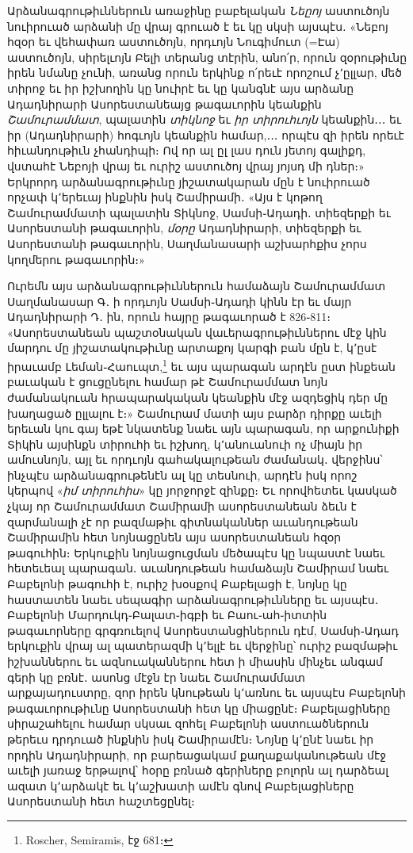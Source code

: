 \documentclass{article}
\begin{document}
{Արձանագրութիւններուն առաջինը բաբելական \emph{Նեըոյ} աստուծոյն նուիրուած արձանի մը վրայ գրուած է եւ կը սկսի այսպէս․ «Նեբոյ հզօր եւ վեհափառ աստուծոյն, որդւոյն Նուգիմուտ (=Էա) աստուծոյն, սիրելւոյն Բելի տերանց տէրին, անո՛ր, որուն զօրութիւնը իրեն նմանը չունի, առանց որուն երկինք ո՛րեւէ որոշում չ՚ըլլար, մեծ տիրոջ եւ իր իշխողին կը նուիրէ եւ կը կանգնէ այս արձանը Ադադնիրարի Ասորեստանեայց թագաւորին կեանքին \emph{Շամուրամմատ}, պալատին \emph{տիկնոջ} եւ \emph{իր տիրուհւոյն} կեանքին․․․ եւ իր (Ադադնիրարի) հոգւոյն կեանքին համար,․․․ որպէս զի իրեն որեւէ հիւանդութիւն չհանդիպի։ Ով որ ալ ըլ լաս դուն յետոյ գալիքդ, վստահէ Նեբոյի վրայ եւ ուրիշ աստուծոյ վրայ յոյսդ մի դներ։» Երկրորդ արձանագրութիւնը յիշատակարան մըն է նուիրուած որչափ կ՚երեւայ ինքնին իսկ Շամիրամի․ «Այս է կոթող Շամուրամմատի պալատին Տիկնոջ, Սամսի֊Ադադի․ տիեզերքի եւ Ասորեստանի թագաւորին, \emph{մօրը} Ադադնիրարի, տիեզերքի եւ Ասորեստանի թագաւորին, Սաղմանասարի աշխարհքիս չորս կողմերու թագաւորին։»

Ուրեմն այս արձանագրութիւններուն համաձայն Շամուրամմատ Սաղմանասար Գ․ ի որդւոյն Սամսի֊Ադադի կինն էր եւ մայր Ադադնիրարի Դ․ ին, որուն հայրը թագաւորած է 826֊811։ «Ասորեստանեան պաշտօնական վաւերագրութիւններու մէջ կին մարդու մը յիշատակութիւնը արտաքոյ կարգի բան մըն է, կ՚ըսէ իրաւամբ Լեման֊Հաուպտ,\footnote{Roscher, Semiramis, էջ 681։} եւ այս պարագան արդէն ըստ ինքեան բաւական է ցուցընելու համար թէ Շամուրամմատ նոյն ժամանակուան հրապարակական կեանքին մէջ ազդեցիկ դեր մը խաղացած ըլլալու է։» Շամուրամ մատի այս բարձր դիրքը աւելի երեւան կու գայ եթէ նկատենք նաեւ այն պարագան, որ արքունիքի Տիկին այսինքն տիրուհի եւ իշխող, կ՚անուանուի ոչ միայն իր ամուսնոյն, այլ եւ որդւոյն գահակալութեան ժամանակ․ վերջինս՝ ինչպէս արձանագրութենէն ալ կը տեսնուի, արդէն իսկ որոշ կերպով «\emph{իմ տիրուհիս}» կը յորջորջէ զինքը։ Եւ որովհետեւ կասկած չկայ որ Շամուրամմատ Շամիրամի ասորեստանեան ձեւն է զարմանալի չէ որ բազմաթիւ գիտնականներ աւանդութեան Շամիրամին հետ նոյնացընեն այս ասորեստանեան հզօր թագուհին։ Երկուքին նոյնացուցման մեծապէս կը նպաստէ նաեւ հետեւեալ պարագան․ աւանդութեան համաձայն Շամիրամ նաեւ Բաբելոնի թագուհի է, ուրիշ խօսքով Բաբելացի է, նոյնը կը հաստատեն նաեւ սեպագիր արձանագրութիւնները եւ այսպէս․ Բաբելոնի Մարդուկդ֊Բալատ֊իգբի եւ Բաու֊ահ֊իտտին թագաւորները գրգռուելով Ասորեստանցիներուն դէմ, Սամսի֊Ադադ երկուքին վրայ ալ պատերազմի կ՚ելլէ եւ վերջինը՝ ուրիշ բազմաթիւ իշխաններու եւ ազնուականներու հետ ի միասին մինչեւ անգամ գերի կը բռնէ․ ասոնց մէջն էր նաեւ Շամուրամմատ արքայադուստրը, զոր իրեն կնութեան կ՚առնու եւ այսպէս Բաբելոնի թագաւորութիւնը Ասորեստանի հետ կը միացընէ։ Բաբելացիները սիրաշահելու համար սկսաւ զոհել Բաբելոնի աստուածներուն թերեւս դրդուած ինքնին իսկ Շամիրամէն։ Նոյնը կ՚ընէ նաեւ իր որդին Ադադնիրարի, որ բարեացակամ քաղաքականութեան մէջ աւելի յառաջ երթալով՝ հօրը բռնած գերիները բոլորն ալ դարձեալ ազատ կ՚արձակէ եւ կ՚աշխատի ամէն գնով Բաբելացիները Ասորեստանի հետ հաշտեցընել։

}
\end{document}

